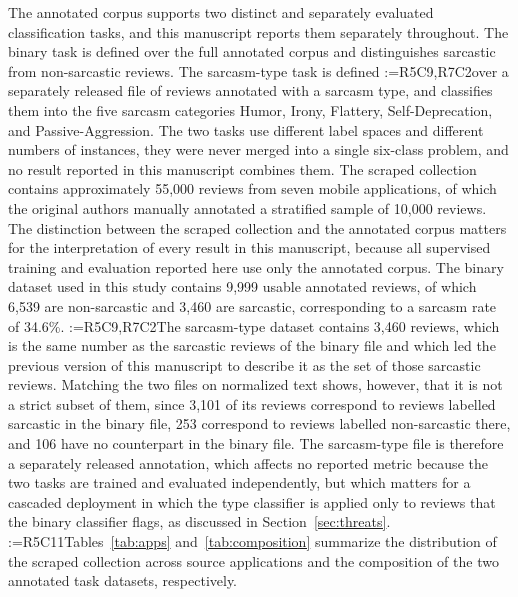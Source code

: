 \documentclass[a4paper,fleqn]{cas-sc}
\makeatletter
\newif\iftracked
\newcommand{\rv@setcolour}[1]{%
  \IfStrEq{#1}{R7C7}{\color{rvEdit}}{%
    \IfSubStr{#1}{R5}{\IfSubStr{#1}{R7}{\color{rvBoth}}{\color{rvFive}}}{\color{rvSeven}}}}
\newcommand{\rv@tag}[1]{\textsuperscript{\sffamily\bfseries\scriptsize[\StrSubstitute{#1}{,}{, }]}\,}
\newcommand{\rv@recordone}[1]{%
  \edef\rv@i{#1}%
  \ifcsdef{rv@n@\rv@i}{}{\csgdef{rv@n@\rv@i}{0}}%
  \csxdef{rv@n@\rv@i}{\the\numexpr\csuse{rv@n@\rv@i}+1\relax}%
  \begingroup\edef\@currentlabel{\rv@i}\label{rv:\rv@i:\csuse{rv@n@\rv@i}}\endgroup}
\newcommand{\rv@record}[1]{\@for\rv@id:=#1\do{\expandafter\rv@recordone\expandafter{\rv@id}}}
\DeclareRobustCommand{\rcrep}[3]{\rv@record{#1}\iftracked{\rv@setcolour{#1}\rv@tag{#1}\rv@strike{#2} #3}\else#3\fi}
\makeatother
\begin{document}
The annotated corpus supports two distinct and separately evaluated classification tasks, and this manuscript reports them separately throughout. The binary task is defined over the full annotated corpus and distinguishes sarcastic from non-sarcastic reviews. The sarcasm-type task is defined \rcrep{R5C9,R7C2}{only over the subset of reviews that were annotated as sarcastic, and classifies them}{over a separately released file of reviews annotated with a sarcasm type, and classifies them} into the five sarcasm categories Humor, Irony, Flattery, Self-Deprecation, and Passive-Aggression. The two tasks use different label spaces and different numbers of instances, they were never merged into a single six-class problem, and no result reported in this manuscript combines them. The scraped collection contains approximately 55,000 reviews from seven mobile applications, of which the original authors manually annotated a stratified sample of 10,000 reviews. The distinction between the scraped collection and the annotated corpus matters for the interpretation of every result in this manuscript, because all supervised training and evaluation reported here use only the annotated corpus. The binary dataset used in this study contains 9,999 usable annotated reviews, of which 6,539 are non-sarcastic and 3,460 are sarcastic, corresponding to a sarcasm rate of 34.6\%. \rcrep{R5C9,R7C2}{The sarcasm-type dataset contains the 3,460 sarcastic reviews.}{The sarcasm-type dataset contains 3,460 reviews, which is the same number as the sarcastic reviews of the binary file and which led the previous version of this manuscript to describe it as the set of those sarcastic reviews. Matching the two files on normalized text shows, however, that it is not a strict subset of them, since 3,101 of its reviews correspond to reviews labelled sarcastic in the binary file, 253 correspond to reviews labelled non-sarcastic there, and 106 have no counterpart in the binary file. The sarcasm-type file is therefore a separately released annotation, which affects no reported metric because the two tasks are trained and evaluated independently, but which matters for a cascaded deployment in which the type classifier is applied only to reviews that the binary classifier flags, as discussed in Section~\ref{sec:threats}.} \rcrep{R5C11}{Tables 2 and 3}{Tables~\ref{tab:apps} and~\ref{tab:composition}} summarize the distribution of the scraped collection across source applications and the composition of the two annotated task datasets, respectively.
\end{document}
